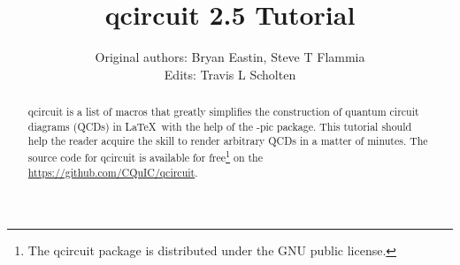 \documentclass[twocolumn,nofootinbib]{revtex4}
\begin{document}
\lstset{language=TeX}

\title{qcircuit 2.5 Tutorial}

\author{Original authors: Bryan Eastin, Steve T Flammia\\ Edits: Travis L Scholten}
	
\begin{abstract}qcircuit is a list of macros that greatly simplifies the construction of 
quantum circuit diagrams (QCDs) in \LaTeX \ with the help of the \Xy-pic 
package.  This tutorial should help the reader acquire 
the skill to render arbitrary QCDs in a matter of minutes. The source code for qcircuit is available for free\footnote{The qcircuit package is distributed under the GNU public license.} on the \href{CQuIC GitHub page}{https://github.com/CQuIC/qcircuit}.
\end{abstract}

\maketitle
\end{document}
